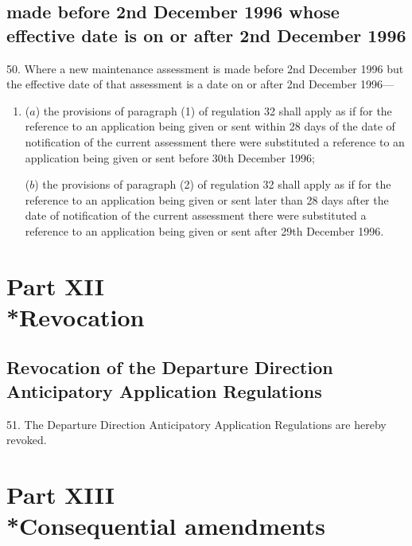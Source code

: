 \documentclass[a4paper]{article}
\newcommand{\parthead}{}
\begin{document}
\subsection[50. Transitional provisions—new maintenance assessment made before 2nd December 1996
whose effective date is on or after 2nd December 1996]{\sloppy {} made before 2nd December 1996
whose effective date is on or after 2nd December 1996}

50. Where a new maintenance
assessment is made before 2nd December 1996 but the effective date of that
assessment is a date on or after 2nd December 1996—
\begin{enumerate}\item[]
($a$) the provisions of paragraph (1) of regulation 32 shall apply as if for the
reference to an application being given or sent within 28 days of the date of
notification of the current assessment there were substituted a reference to an
application being given or sent before 30th December 1996;

($b$) the provisions of paragraph (2) of regulation 32 shall apply as if for the
reference to an application being given or sent later than 28 days after the
date of notification of the current assessment there were substituted a
reference to an application being given or sent after 29th December 1996.
\end{enumerate}

\section[Part XII --- Revocation]{Part XII\\*Revocation}

\renewcommand\parthead{--- Part XII}

\subsection[51. Revocation of the Departure Direction Anticipatory Application
Regulations]{Revocation of the Departure Direction Anticipatory Application
Regulations}

51. The Departure Direction Anticipatory Application Regulations are
hereby revoked.

\section[Part XIII --- Consequential amendments]{Part XIII\\*Consequential amendments}
\end{document}
